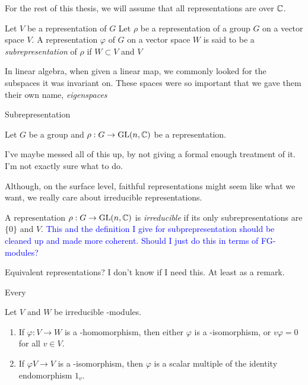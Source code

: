 For the rest of this thesis, we will assume that all representations are over $\mathbb{C}$.



\begin{definition}
    Let $V$ be a representation of $G$
    Let $\rho$ be a representation of a group $G$ on a vector space $V$. A representation $\varphi$ of $G$ on a 
vector space $W$ is said to be a \emph{subrepresentation} of $\rho$ if $W \subset V$ and $V$ \end{definition}

In linear algebra, when given a linear map, we commonly looked for the subspaces it was invariant on. These spaces 
were so important that we gave them their own name, \emph{eigenspaces}

\begin{definition}
    Subrepresentation

    Let $G$ be a group and $\rho : G \rightarrow \operatorname{GL}(n, \mathbb{C})$ be a representation. 


    I've maybe messed all of this up, by not giving a formal enough treatment of it. I'm not exactly sure what to 
    do.

\end{definition}


Although, on the surface level, faithful representations might seem like what we want, we really care about 
irreducible representations.



\begin{definition}
    A representation $\rho : G \rightarrow \operatorname{GL}(n, \mathbb{C})$ is \emph{irreducible} if its only subrepresentations are 
    $\{0\}$ and $V$. \textcolor{blue}{This and the definition I give for subprepresentation should be cleaned up 
    and made more coherent. Should I just do this in terms of FG-modules?}
\end{definition}



\begin{definition}
    Equivalent representations? I don't know if I need this. At least as a remark.
\end{definition}


\begin{theorem}
    Every 
\end{theorem}

\begin{theorem}
    Let $V$ and $W$ be irreducible \CG-modules.

    \begin{enumerate}
        \item If $\varphi : V \rightarrow W$ is a \CG-homomorphism, then either $\varphi$ is a \CG-isomorphism, or 
            $v\varphi = 0$ for all $v \in V$. 
            
        \item If $\varphi V \rightarrow V$ is a \CG-isomorphism, then $\varphi$ is a scalar multiple of the 
            identity endomorphism $1_v$.
    \end{enumerate}
\end{theorem}

